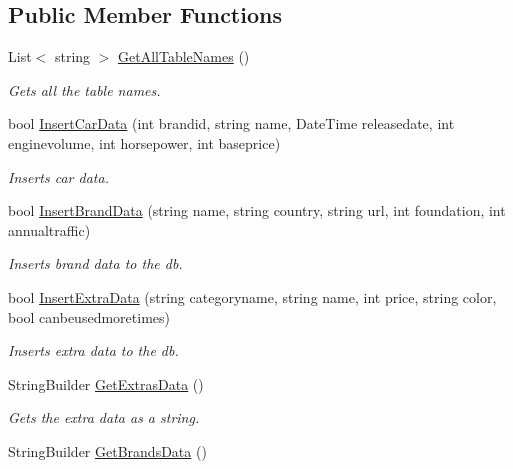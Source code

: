 \subsection*{Public Member Functions}
\begin{DoxyCompactItemize}
\item 
List$<$ string $>$ \mbox{\hyperlink{interface_car_shop_1_1_logic_1_1_i_logic_aee2a118a9a867dbc77901298cf112e02}{Get\+All\+Table\+Names}} ()
\begin{DoxyCompactList}\small\item\em Gets all the table names. \end{DoxyCompactList}\item 
bool \mbox{\hyperlink{interface_car_shop_1_1_logic_1_1_i_logic_a0104ebc2edcff4017359ed2efc5dd7d3}{Insert\+Car\+Data}} (int brandid, string name, Date\+Time releasedate, int enginevolume, int horsepower, int baseprice)
\begin{DoxyCompactList}\small\item\em Inserts car data. \end{DoxyCompactList}\item 
bool \mbox{\hyperlink{interface_car_shop_1_1_logic_1_1_i_logic_a3be954920563765e2f6a2ea6d62b4159}{Insert\+Brand\+Data}} (string name, string country, string url, int foundation, int annualtraffic)
\begin{DoxyCompactList}\small\item\em Inserts brand data to the db. \end{DoxyCompactList}\item 
bool \mbox{\hyperlink{interface_car_shop_1_1_logic_1_1_i_logic_ab6555201068cf4a875c3075ce425345e}{Insert\+Extra\+Data}} (string categoryname, string name, int price, string color, bool canbeusedmoretimes)
\begin{DoxyCompactList}\small\item\em Inserts extra data to the db. \end{DoxyCompactList}\item 
String\+Builder \mbox{\hyperlink{interface_car_shop_1_1_logic_1_1_i_logic_a5ad3fa8e566e99e43a70a5e9f7ffb114}{Get\+Extras\+Data}} ()
\begin{DoxyCompactList}\small\item\em Gets the extra data as a string. \end{DoxyCompactList}\item 
String\+Builder \mbox{\hyperlink{interface_car_shop_1_1_logic_1_1_i_logic_a3fad1ae2fa55b77fedf2688e9915f376}{Get\+Brands\+Data}} ()

\end{DoxyCompactItemize}
